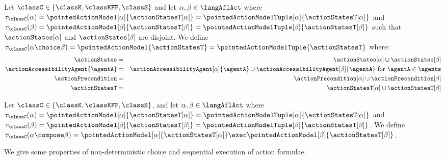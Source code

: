 \documentclass[twoside]{aiml14}
\begin{document}
  \begin{definition}\label{afl-choice}
      Let $\classC \in \{\classK, \classKFF, \classS\}$
      and let $\alpha, \beta \in \langAflAct$ 
      where $\tau_\classC(\alpha) = \pointedActionModel[\alpha]{\actionStatesT[\alpha]} = \pointedActionModelTuple[\alpha]{\actionStatesT[\alpha]}$
      and $\tau_\classC(\beta) = \pointedActionModel[\beta]{\actionStatesT[\beta]} = \pointedActionModelTuple[\beta]{\actionStatesT[\beta]}$
      such that $\actionStates[\alpha]$ and $\actionStates[\beta]$ are disjoint.
      We define $\tau_\classC(\alpha \choice \beta) = \pointedActionModel{\actionStatesT} = \pointedActionModelTuple{\actionStatesT}$ where:
      \begin{eqnarray*}
          \actionStates &=& \actionStates[\alpha] \cup \actionStates[\beta]\\
          \actionAccessibilityAgent{\agentA} &=& \actionAccessibilityAgent[\alpha]{\agentA} \cup \actionAccessibilityAgent[\beta]{\agentA} \text{ for } \agentA \in \agents\\
          \actionPrecondition &=& \actionPrecondition[\alpha] \cup \actionPrecondition[\beta]\\
          \actionStatesT &=& \actionStatesT[\alpha] \cup \actionStatesT[\beta]
      \end{eqnarray*}
  \end{definition}

  \begin{definition}\label{afl-sequential}
      Let $\classC \in \{\classK, \classKFF, \classS\}$,
      and let $\alpha, \beta \in \langAflAct$ where 
      $\tau_\classC(\alpha) = \pointedActionModel[\alpha]{\actionStatesT[\alpha]} = \pointedActionModelTuple[\alpha]{\actionStatesT[\alpha]}$ and
      $\tau_\classC(\beta) = \pointedActionModel[\beta]{\actionStatesT[\beta]} = \pointedActionModelTuple[\beta]{\actionStatesT[\beta]}$.
      We define $\tau_\classC(\alpha \compose \beta) = \pointedActionModel[\alpha]{\actionStatesT[\alpha]} \exec \pointedActionModel[\beta]{\actionStatesT[\beta]}$.
  \end{definition}

  We give some properties of non-deterministic choice and sequential execution
  of action formulae.
\end{document}
